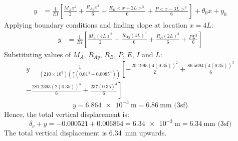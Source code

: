 \documentclass[11pt]{article}
\numberwithin{equation}{section}
\begin{document}
\begin{align}
    y &= \frac{1}{EI} \left[\frac{M_A x^2}{2} + \frac{R_{Ay}x^3}{6} + \frac{R_B<x- 2L>^3}{6} + \frac{P<x-3L>^3}{6}\right] + \theta_0 x +y_0
\end{align}
Applying boundary conditions and finding slope at location $x=4L$:
\begin{align}
    y &= \frac{1}{EI} \left[\frac{M_A (4L)^2}{2} + \frac{R_{Ay}(4L)^3}{6} + \frac{R_B(2L)^3}{6} + \frac{PL^3}{6}\right]
\end{align}
Substituting values of $M_{A}$, $R_{Ay}$, $R_B$, $P$, $E$, $I$ and $L$:
\begin{multline}
    y = \frac{1}{\left(210\times 10^9\right)\left(\frac{\pi}{4}\left(0.01^4-0.0085^4\right)\right)} \left[-\frac{20.1995 (4(0.35))^2}{2} + \frac{86.5694(4(0.35))^3}{6} \right. \\ \left. - \frac{281.2393(2(0.35))^3}{6} + \frac{237(0.35)^3}{6}\right]
\end{multline}
\begin{equation}
    y = \SI{6.864e-3}{\meter} = \SI{6.86}{\milli \meter} \textrm{ (3sf)}
\end{equation}
Hence, the total vertical displacement is:
\begin{equation}
    \delta_v + y = -0.000521+0.006864=\SI{6.34e-3}{\meter} = \SI{6.34}{\milli\meter} \textrm{ (3sf)}
\end{equation}
The total vertical displacement is \SI{6.34}{\milli\meter} upwards.
\end{document}
